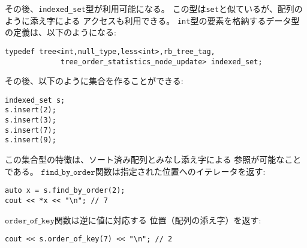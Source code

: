 \begin{comment}
After this, we can define a data structure \texttt{indexed\_set} that
is like \texttt{set} but can be indexed like an array.
The definition for \texttt{int} values is as follows:
\end{comment}

その後、\texttt{indexed\_set}型が利用可能になる。
この型は\texttt{set}と似ているが、配列のように添え字による
アクセスも利用できる。
\texttt{int}型の要素を格納するデータ型の定義は、以下のようになる:
\begin{lstlisting}
typedef tree<int,null_type,less<int>,rb_tree_tag,
             tree_order_statistics_node_update> indexed_set; 
\end{lstlisting}

\begin{comment}
Now we can create a set as follows:
\end{comment}

その後、以下のように集合を作ることができる:
\begin{lstlisting}
indexed_set s;
s.insert(2);
s.insert(3);
s.insert(7);
s.insert(9);
\end{lstlisting}

\begin{comment}
The speciality of this set is that we have access to
the indices that the elements would have in a sorted array.
The function $\texttt{find\_by\_order}$ returns
an iterator to the element at a given position:
\end{comment}

この集合型の特徴は、ソート済み配列とみなし添え字による
参照が可能なことである。
$\texttt{find\_by\_order}$関数は指定された位置へのイテレータを返す:
\begin{lstlisting}
auto x = s.find_by_order(2);
cout << *x << "\n"; // 7
\end{lstlisting}

\begin{comment}
And the function $\texttt{order\_of\_key}$
returns the position of a given element:
\end{comment}
$\texttt{order\_of\_key}$関数は逆に値に対応する
位置（配列の添え字）を返す:
\begin{lstlisting}
cout << s.order_of_key(7) << "\n"; // 2
\end{lstlisting}

\begin{comment}
If the element does not appear in the set,
we get the position that the element would have
in the set:
\end{comment}

